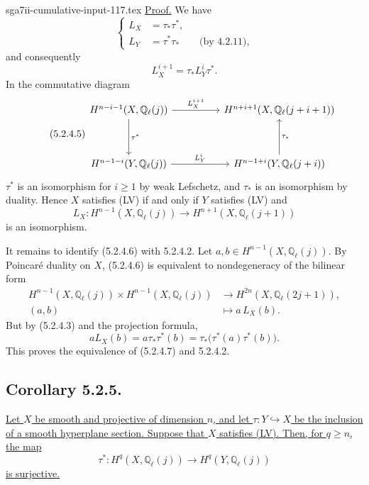 \begin{filecontents*}{sga7ii-cumulative-input-117.tex}
\underline{Proof.}
We have
\begin{equation}\tag{5.2.4.3}
\left\{
\begin{aligned}
L_X&=\tau_*\tau^*,\\[1ex]
L_Y&=\tau^*\tau_* \qquad\text{(by 4.2.11),}
\end{aligned}
\right.
\end{equation}
and consequently
\begin{equation}\tag{5.2.4.4}
L_X^{i+1}=\tau_*L_Y^i\tau^*.
\end{equation}
In the commutative diagram
\begin{equation}\tag{5.2.4.5}
\begin{tikzcd}[column sep=huge,row sep=huge]
H^{n-i-1}(X,\mathbb Q_\ell(j))
  \arrow[r,"L_X^{i+1}"]\arrow[d,"\tau^*"]
  &H^{n+i+1}(X,\mathbb Q_\ell(j+i+1))\\
H^{n-1-i}(Y,\mathbb Q_\ell(j))
  \arrow[r,"L_Y^i"]
  &H^{n-1+i}(Y,\mathbb Q_\ell(j+i))\arrow[u,"\tau_*"']
\end{tikzcd}
\end{equation}
$\tau^*$ is an isomorphism for $i\geq1$ by weak Lefschetz, and $\tau_*$ is
an isomorphism by duality.  Hence $X$ satisfies (LV) if and only if $Y$
satisfies (LV) and
\begin{equation}\tag{5.2.4.6}
L_X:H^{n-1}(X,\mathbb Q_\ell(j))
\longrightarrow H^{n+1}(X,\mathbb Q_\ell(j+1))
\end{equation}
is an isomorphism.

It remains to identify (5.2.4.6) with 5.2.4.2.  Let
$a,b\in H^{n-1}(X,\mathbb Q_\ell(j))$.  By Poincaré duality on $X$,
(5.2.4.6) is equivalent to nondegeneracy of the bilinear form
\begin{equation}\tag{5.2.4.7}
\begin{aligned}
H^{n-1}(X,\mathbb Q_\ell(j))\times
H^{n-1}(X,\mathbb Q_\ell(j))
&\longrightarrow H^{2n}(X,\mathbb Q_\ell(2j+1)),\\
(a,b)&\longmapsto a\,L_X(b).
\end{aligned}
\end{equation}
But by (5.2.4.3) and the projection formula,
\[
aL_X(b)=a\tau_*\tau^*(b)
=\tau_*\bigl(\tau^*(a)\tau^*(b)\bigr).
\]
This proves the equivalence of (5.2.4.7) and 5.2.4.2.

\subsection*{Corollary 5.2.5.}
\underline{Let $X$ be smooth and projective of dimension $n$, and let
$\tau:Y\hookrightarrow X$ be the inclusion of a smooth hyperplane section.
Suppose that $X$ satisfies (LV).  Then, for $q\geq n$, the map}
\[
\tau^*:H^q(X,\mathbb Q_\ell(j))
\longrightarrow H^q(Y,\mathbb Q_\ell(j))
\]
\underline{is surjective.}


\end{filecontents*}
